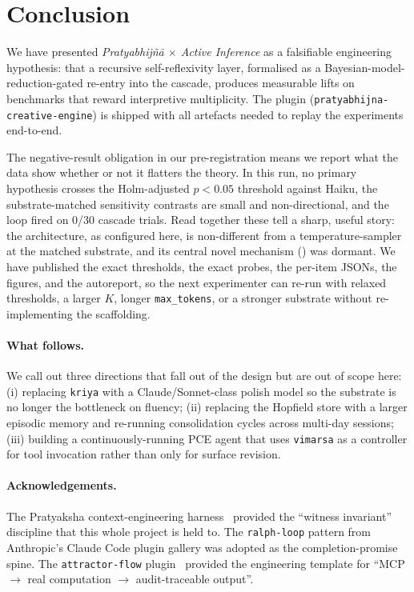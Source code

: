 \section{Conclusion}\label{sec:conclusion}

We have presented \emph{Pratyabhij\~n\=a $\times$ Active Inference} as a falsifiable engineering hypothesis: that a recursive self-reflexivity layer, formalised as a Bayesian-model-reduction-gated re-entry into the cascade, produces measurable lifts on benchmarks that reward interpretive multiplicity. The plugin (\texttt{pratyabhijna-creative-engine}) is shipped with all artefacts needed to replay the experiments end-to-end.

The negative-result obligation in our pre-registration means we report what the data show whether or not it flatters the theory. In this run, no primary hypothesis crosses the Holm-adjusted $p<0.05$ threshold against Haiku, the substrate-matched sensitivity contrasts are small and non-directional, and the  loop fired on 0/30 cascade trials. Read together these tell a sharp, useful story: the architecture, as configured here, is non-different from a temperature-sampler at the matched substrate, and its central novel mechanism () was dormant. We have published the exact thresholds, the exact probes, the per-item JSONs, the figures, and the autoreport, so the next experimenter can re-run with relaxed thresholds, a larger $K$, longer \texttt{max\_tokens}, or a stronger substrate without re-implementing the scaffolding.

\paragraph{What follows.} We call out three directions that fall out of the design but are out of scope here: (i) replacing \texttt{kriya} with a Claude/Sonnet-class polish model so the substrate is no longer the bottleneck on fluency; (ii) replacing the Hopfield store with a larger episodic memory and re-running consolidation cycles across multi-day sessions; (iii) building a continuously-running PCE agent that uses \texttt{vimarsa} as a controller for tool invocation rather than only for surface revision.

\paragraph{Acknowledgements.} The Pratyaksha context-engineering harness~\citep{PratyakshaContextEng2025} provided the ``witness invariant'' discipline that this whole project is held to. The \texttt{ralph-loop} pattern from Anthropic's Claude Code plugin gallery was adopted as the completion-promise spine. The \texttt{attractor-flow} plugin~\citep{AttractorFlow2025} provided the engineering template for ``MCP $\to$ real computation $\to$ audit-traceable output''.
